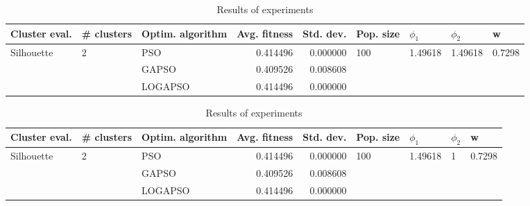 \documentclass{article}
\begin{document}
\begin{table}
\centering
\caption{Results of experiments}
\begin{tabular}{lllrrllll}
\toprule
              Cluster eval. &        \# clusters & Optim. algorithm &  Avg. fitness &  Std. dev. &            Pop. size &               $\phi_{1}$ &               $\phi_{2}$ &                       w \\
\midrule
\multirow{3}{*}{Silhouette} & \multirow{3}{*}{2} &              PSO &      0.414496 &   0.000000 & \multirow{3}{*}{100} & \multirow{3}{*}{1.49618} & \multirow{3}{*}{1.49618} & \multirow{3}{*}{0.7298} \\
                            &                    &            GAPSO &      0.409526 &   0.008608 &                      &                          &                          &                         \\
                            &                    &          LOGAPSO &      0.414496 &   0.000000 &                      &                          &                          &                         \\
\bottomrule
\end{tabular}
\end{table}
\begin{table}
\centering
\caption{Results of experiments}
\begin{tabular}{lllrrllll}
\toprule
              Cluster eval. &        \# clusters & Optim. algorithm &  Avg. fitness &  Std. dev. &            Pop. size &               $\phi_{1}$ &         $\phi_{2}$ &                       w \\
\midrule
\multirow{3}{*}{Silhouette} & \multirow{3}{*}{2} &              PSO &      0.414496 &   0.000000 & \multirow{3}{*}{100} & \multirow{3}{*}{1.49618} & \multirow{3}{*}{1} & \multirow{3}{*}{0.7298} \\
                            &                    &            GAPSO &      0.409526 &   0.008608 &                      &                          &                    &                         \\
                            &                    &          LOGAPSO &      0.414496 &   0.000000 &                      &                          &                    &                         \\
\bottomrule
\end{tabular}
\end{table}
\end{document}
